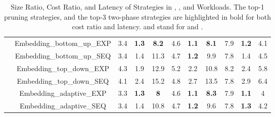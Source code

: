 \begin{table}[bt]
{\begin{tabular}{|c|c|c|c|c|c|c|c|c|c|c|}
&Embedding\_bottom\_up\_EXP& 3.4 & \textbf{1.3} & \textbf{8.2}    & 4.6 & \textbf{1.1}& \textbf{8.1} & 7.9 & \textbf{1.2} & 4.1 \\
&Embedding\_bottom\_up\_SEQ& 3.4 & 1.4 & 11.3 & 4.7 & \textbf{1.2}& 9.9 & 7.8 & 1.4 & 4.5\\
&Embedding\_top\_down\_EXP& 4.3 & 1.9 & 12.9 & 5.2 & 2.2& 10.8&8.2 & 2.4 & 5.8\\
&Embedding\_top\_down\_SEQ& 4.1 & 2.4 & 15.2 &  4.8 & 2.7& 13.5& 7.8 & 2.9 & 6.4\\
&Embedding\_adaptive\_EXP& 3.3 & \textbf{1.3} & \textbf{8}    & 4.6 & \textbf{1.1}& \textbf{8.3} & 7.9 & \textbf{1.1} & 4 \\
&Embedding\_adaptive\_SEQ& 3.4 & 1.4 & 10.8 & 4.7 & \textbf{1.2}& 9.6 & 7.8 & \textbf{1.3} & 4.2\\
\hline
\end{tabular}}
\caption{\small Size Ratio, Cost Ratio, and Latency of Strategies in , , and  Workloads. The top-1 pruning strategies, and the top-3 two-phase strategies are highlighted in bold for both cost ratio and latency.  and  stand for  and . }
\papertext{\vspace{-2.5em}}
\techreport{\vspace{-2em}}
\label{tab:top-1}
\end{table}





